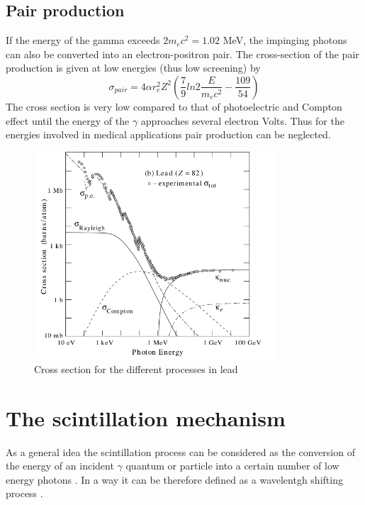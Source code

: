 \subsection{Pair production}

If the energy of the gamma exceeds $2m_{e}c^{2} = 1.02$ MeV, the impinging photons can also be converted into an electron-positron pair. The cross-section of the pair production is given at low energies (thus low screening) by
\begin{equation}
\sigma _{pair} = 4\alpha r_{e}^{2} Z^{2} \left( \frac{7}{9}ln2\frac{E}{m_{e}c^{2}} - \frac{109}{54}\right)
\end{equation}
The cross section is very low compared to that of photoelectric and Compton effect until the energy of the $\gamma$ approaches several electron Volts. Thus for the energies involved in medical applications pair production can be neglected.


\begin{figure}
\centering
\includegraphics[width=9cm]{../Pictures/Chapter_2/sigma_gamma.pdf}
\caption[$\gamma$ cross section]{Cross section for the different processes in lead}
\label{fig:cross_section}
\end{figure}
\newpage
\section{The scintillation mechanism}

As a general idea the scintillation process can be considered as the conversion of the energy of an incident $\gamma$ quantum or particle into a certain number of low energy photons \cite{Rodnyi1997}. In a way it can be therefore defined as a wavelentgh shifting process \cite{Lecoq2006}.

